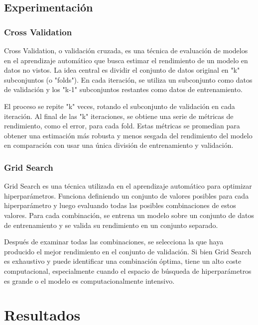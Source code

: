 \documentclass[12pt]{article}
\begin{document}
 
\subsection{Experimentación}



\subsubsection{Cross Validation}

Cross Validation, o validación cruzada, es una técnica de evaluación de modelos en el aprendizaje automático que busca estimar el rendimiento de un modelo en datos no vistos. La idea central es dividir el conjunto de datos original en "k" subconjuntos (o "folds"). En cada iteración, se utiliza un subconjunto como datos de validación y los "k-1" subconjuntos restantes como datos de entrenamiento.

El proceso se repite "k" veces, rotando el subconjunto de validación en cada iteración. Al final de las "k" iteraciones, se obtiene una serie de métricas de rendimiento, como el error, para cada fold. Estas métricas se promedian para obtener una estimación más robusta y menos sesgada del rendimiento del modelo en comparación con usar una única división de entrenamiento y validación.


\subsubsection{Grid Search}

Grid Search es una técnica utilizada en el aprendizaje automático para optimizar hiperparámetros. Funciona definiendo un conjunto de valores posibles para cada hiperparámetro y luego evaluando todas las posibles combinaciones de estos valores. Para cada combinación, se entrena un modelo sobre un conjunto de datos de entrenamiento y se valida su rendimiento en un conjunto separado.

Después de examinar todas las combinaciones, se selecciona la que haya producido el mejor rendimiento en el conjunto de validación. Si bien Grid Search es exhaustivo y puede identificar una combinación óptima, tiene un alto coste computacional, especialmente cuando el espacio de búsqueda de hiperparámetros es grande o el modelo es computacionalmente intensivo.

\section{Resultados}
\end{document}

